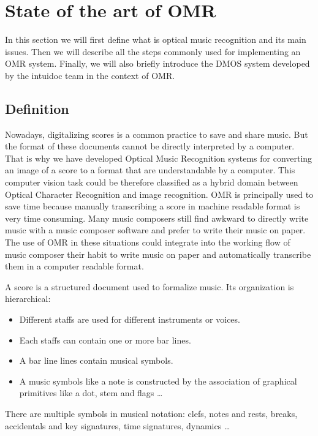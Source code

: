 \documentclass[11pt]{sdm}
\begin{document}
\section{State of the art of OMR}


In this section we will first define what is optical music recognition and its main issues.
Then we will describe all the steps commonly used for implementing an OMR system.
Finally, we will also briefly introduce the DMOS system developed by the intuidoc team in the context of OMR.


\subsection{Definition}


Nowadays, digitalizing scores is a common practice to save and share music.
But the format of these documents cannot be directly interpreted by a computer.
That is why we have developed Optical Music Recognition systems for converting an image of a score to a format that are understandable by a computer.
This computer vision task could be therefore classified as a hybrid domain between Optical Character Recognition and image recognition.
OMR is principally used to save time because manually transcribing a score in machine readable format is very time consuming.
Many music composers still find awkward to directly write music with a music composer software and prefer to write their music on paper.
The use of OMR in these situations could integrate into the working flow of music composer their habit to write music on paper and automatically transcribe them in a computer readable format.


A score is a structured document used to formalize music.
Its organization is hierarchical:
\begin{itemize}
  \item Different staffs are used for different instruments or voices.
  \item Each staffs can contain one or more bar lines.
  \item A bar line lines contain musical symbols.
  \item A music symbols like a note is constructed by the association of graphical primitives like a dot, stem and flags \ldots
\end{itemize}
There are multiple symbols in musical notation: clefs, notes and rests, breaks, accidentals and key signatures, time signatures, dynamics \ldots
\end{document}
